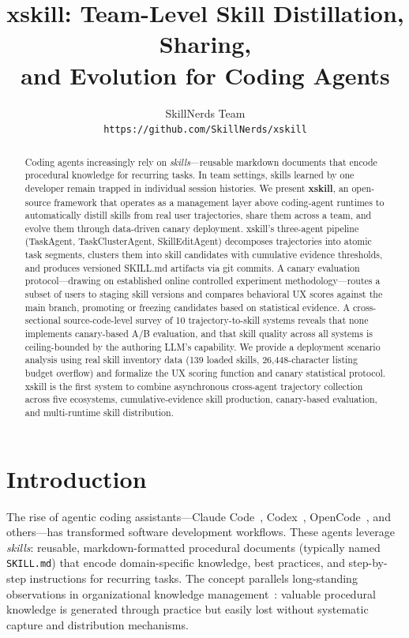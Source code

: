 \documentclass[11pt]{article}
\title{xskill: Team-Level Skill Distillation, Sharing,\\ and Evolution for Coding Agents}
\author{
  SkillNerds Team \\
  \texttt{https://github.com/SkillNerds/xskill}
}
\begin{document}
\maketitle

\begin{abstract}
Coding agents increasingly rely on \emph{skills}---reusable markdown documents that encode procedural knowledge for recurring tasks. In team settings, skills learned by one developer remain trapped in individual session histories. We present \textbf{xskill}, an open-source framework that operates as a management layer above coding-agent runtimes to automatically distill skills from real user trajectories, share them across a team, and evolve them through data-driven canary deployment. xskill's three-agent pipeline (TaskAgent, TaskClusterAgent, SkillEditAgent) decomposes trajectories into atomic task segments, clusters them into skill candidates with cumulative evidence thresholds, and produces versioned SKILL.md artifacts via git commits. A canary evaluation protocol---drawing on established online controlled experiment methodology---routes a subset of users to staging skill versions and compares behavioral UX scores against the main branch, promoting or freezing candidates based on statistical evidence. A cross-sectional source-code-level survey of 10 trajectory-to-skill systems reveals that none implements canary-based A/B evaluation, and that skill quality across all systems is ceiling-bounded by the authoring LLM's capability. We provide a deployment scenario analysis using real skill inventory data (139 loaded skills, 26{,}448-character listing budget overflow) and formalize the UX scoring function and canary statistical protocol. xskill is the first system to combine asynchronous cross-agent trajectory collection across five ecosystems, cumulative-evidence skill production, canary-based evaluation, and multi-runtime skill distribution.
\end{abstract}

\section{Introduction}
\label{sec:intro}

The rise of agentic coding assistants---Claude Code~\citep{anthropic2025claude}, Codex~\citep{openai2025codex}, OpenCode~\citep{sst2025opencode}, and others---has transformed software development workflows. These agents leverage \emph{skills}: reusable, markdown-formatted procedural documents (typically named \texttt{SKILL.md}) that encode domain-specific knowledge, best practices, and step-by-step instructions for recurring tasks. The concept parallels long-standing observations in organizational knowledge management~\citep{nonaka1995knowledge}: valuable procedural knowledge is generated through practice but easily lost without systematic capture and distribution mechanisms.
\end{document}
